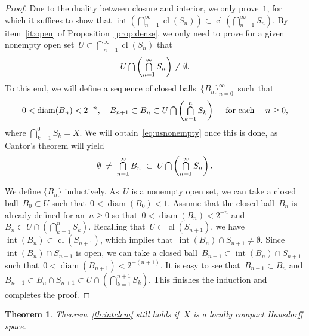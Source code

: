 \documentclass[11pt,a4paper]{article}  %
\newtheorem{theorem}{Theorem}[section]
\theoremstyle{definition}
\DeclareMathOperator*{\mcap}{\mathsmaller{\bigcap}}
\newcommand{\diam}{\operatorname{diam}}
\DeclareMathOperator{\inter}{int}
\DeclareMathOperator{\cl}{cl}
\numberwithin{equation}{section}
\begin{document}
\begin{proof}
  Due to the duality between closure and interior, we only prove~$1$, for which it suffices to show that
  $\inter(\bigcap_{n=1}^\infty \cl(S_n))\subset \cl(\bigcap_{n=1}^\infty S_n)$.
  By item~\ref{it:open} of Proposition~\ref{prop:dense}, we only need to prove for a given
  nonempty open set~$U \subset \bigcap_{n=1}^\infty \cl(S_n)$ that%
  \begin{equation}
    \label{eq:usnonempty}
    U\mcap\left(\mcap_{n=1}^\infty S_n\right) \neq \emptyset.
  \end{equation}
  To this end, we will define a sequence of closed balls~$\{B_n\}_{n=0}^\infty$~such~that%
  \begin{equation}
    \label{eq:nest}
  0< \diam(B_n)< 2^{-n},
  \quad
  B_{n+1} \subset B_{n} \subset  U\mcap\left(\mcap_{k=1}^n S_k\right)
  \quad \text{ for each } \quad  n \ge 0,
  \end{equation}
  where $\bigcap_{k=1}^0 S_k=X$.
  We will obtain~\eqref{eq:usnonempty} once this is done, as
  Cantor's theorem will yield
    \begin{equation}
      \label{eq:nestnonempty}
      \emptyset \;\neq \;\mcap_{n=1}^\infty B_n \;\subset\; U\mcap \left(\mcap_{n=1}^\infty
      S_n\right).
    \end{equation}

    We define $\{B_n\}$ inductively.
    As~$U$ is a nonempty open set, we can take a closed ball~$B_0\subset U$
    such that~$0<\diam(B_0)< 1$.
    Assume that the closed ball~$B_n$ is already defined for an~$n\ge 0$
    so that~$0<\diam(B_n)< 2^{-n}$ and~$B_n\subset U\cap(\bigcap_{k=1}^n S_k)$.
    Recalling that~$U\subset\cl(S_{n+1})$,
    we have~$\inter(B_n)\subset \cl(S_{n+1})$, which implies that~$\inter(B_n) \cap S_{n+1} \neq
    \emptyset$. Since~$\inter(B_n)\cap S_{n+1}$ is open, we
    can take a closed ball~$B_{n+1}\subset \inter(B_n)\cap S_{n+1}$ such that~$0<\diam(B_{n+1})< 2^{-(n+1)}$.
    It is easy to see that~$B_{n+1}\subset B_n$ and
    $B_{n+1}\subset B_{n}\cap S_{n+1} \subset U\cap(\bigcap_{k=1}^{n+1} S_k)$.
     This finishes the induction and completes the proof.
\end{proof}

\begin{theorem}
  \label{th:intcllch} Theorem~\ref{th:intclcm} still holds if~$X$ is a locally compact Hausdorff
  space.
\end{theorem}
\end{document}
